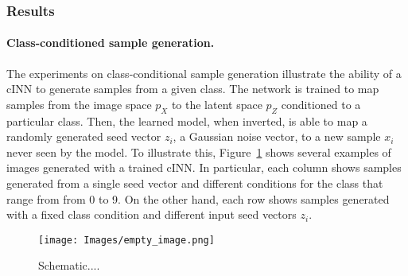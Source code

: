         \subsubsection{Results}
            \paragraph{Class-conditioned sample generation.} 
            The experiments on class-conditional sample generation illustrate the ability of a cINN to generate samples from a given class. The network is trained to map samples from the image space $p_X$ to the latent space $p_Z$ conditioned to a particular class. Then, the learned model, when inverted, is able to map a randomly generated seed vector $z_i$, a Gaussian noise vector, to a new sample $x_i$ never seen by the model. To illustrate this, Figure~\ref{fig:exp_class_cond} shows several examples of images generated with a trained cINN. In particular, each column shows samples generated from a single seed vector and different conditions for the class that range from from 0 to 9. On the other hand, each row shows samples generated with a fixed class condition and different input seed vectors $z_i$.

            \begin{figure}
                \vskip -0.2in 
                \centering
    
                \texttt{[image: Images/empty\_image.png]} 
                
                \vspace{-2pt}
                \caption{\label{fig:exp_class_cond} Schematic.... }
                \vskip -0.0in 
            \end{figure}

